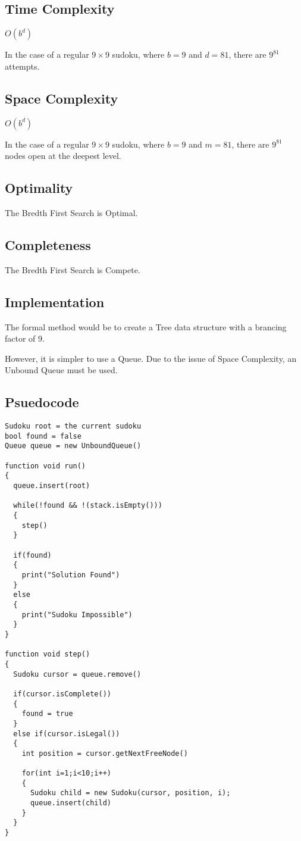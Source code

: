 \documentclass[10pt,letterpaper]{article}
\begin{document}
    \subsection{Time Complexity}
      \(O(b^d)\)
      
      In the case of a regular \(9\times 9\) sudoku, where  \(b = 9\) and \(d = 81\), there are \(9^{81}\) attempts.
      
    \subsection{Space Complexity}
      \(O(b^d)\)
      
      In the case of a regular \(9\times 9\) sudoku, where  \(b = 9\) and \(m = 81\), there are \(9^{81}\) nodes open at the deepest level.
      
    \subsection{Optimality}
      The Bredth First Search is Optimal.
      
    \subsection{Completeness}
      The Bredth First Search is Compete.
      
    \subsection{Implementation}
      The formal method would be to create a Tree data structure with a brancing factor of 9.
      
      However, it is simpler to use a Queue. Due to the issue of Space Complexity, an Unbound Queue must be used.
    
    \newpage
    \subsection{Psuedocode}
      \begin{verbatim}
Sudoku root = the current sudoku
bool found = false
Queue queue = new UnboundQueue()

function void run()
{
  queue.insert(root)
  
  while(!found && !(stack.isEmpty()))
  {
    step()
  }
  
  if(found)
  {
    print("Solution Found")
  }
  else
  {
    print("Sudoku Impossible")
  }
}

function void step()
{
  Sudoku cursor = queue.remove()
  
  if(cursor.isComplete())
  {
    found = true
  }
  else if(cursor.isLegal())
  {
    int position = cursor.getNextFreeNode()
    
    for(int i=1;i<10;i++)
    {
      Sudoku child = new Sudoku(cursor, position, i);
      queue.insert(child)
    }
  }
}
      \end{verbatim}
  
\end{document}

